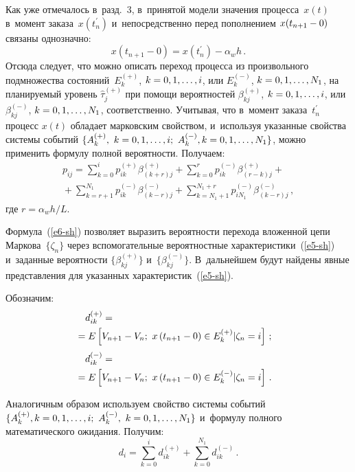 \begin{multicols}{2}
  Как уже отмечалось в~разд.~3, в~принятой модели значения процесса~$x(t)$ 
в~момент заказа~$x(t_n^\prime)$ и~непосредственно перед пополнением 
$x(t_{n+1}\hm-0)$ связаны однозначно: 
  $$
  x\left(t_{n+1}-0\right)= x\left(t_n^\prime\right)- \alpha_w h\,.
  $$
     Отсюда следует, что 
можно описать переход процесса из произвольного подмножества 
состояний~$E_k^{(+)}$, $k\hm=0,1,\ldots ,i$,  или $E_k^{(-)}$, $k\hm=0,1,\ldots , 
N_1$, на планируемый уровень $\hat{\tau}_j^{(+)}$ при помощи вероятностей 
$\beta_{kj}^{(+)}$, $k\hm=0,1,\ldots ,i$,  или~$\beta_{kj}^{(-)}$, $k\hm=0,1,\ldots 
, N_1$, соответственно. Учитывая, что в~момент заказа~$t_n^\prime$ процесс 
$x(t)$ обладает марковским свойством, и~используя указанные свойства 
системы событий $\{A_k^{(+)},\ k\hm= 0,1,\ldots, i;\ A_k^{(-)}, k\hm= 0,1,\ldots , 
N_1\}$, можно применить формулу полной вероятности. По\-лу\-чаем:
  \begin{multline}
  p_{ij}=\sum\limits^i_{k=0} p_{ik}^{(+)} \beta^{(+)}_{(k+r)j} 
+\sum\limits^r_{k=0} p_{ik}^{(-)} \beta^{(+)}_{(r-k)j} 
+{}\\[3pt]
{}+\sum\limits^{N_1}_{k=r+1} p_{ik}^{(-)} \beta^{(-)}_{(k-r)j}
+ \sum\limits_{k=N_1+1}^{N_1+r} p_{iN_1}^{(-)} \beta_{(k-r)j}^{(-)}\,,
  \label{e6-sh}
  \end{multline}
где $r=\alpha_w h/L$.

  Формула~(\ref{e6-sh}) позволяет выразить вероятности перехода вложенной 
цепи Маркова~$\{\zeta_n\}$ через вспомогательные вероятностные 
характеристики~(\ref{e5-sh}) и~заданные вероятности  
$\{ \beta_{kj}^{(+)}\}$ и~$\{\beta_{kj}^{(-)}\}$. В~дальнейшем будут найдены 
явные представления для указанных характеристик~(\ref{e5-sh}). 
{ %

}
  
  Обозначим:
  \begin{align}
  d_{ik}^{(+)} &={}\notag\\
&\hspace*{-10mm} {}= E\left[ V_{n+1} -V_n;\ x\left( t_{n+1}-0\right)\in E_k^{(+)}\vert 
\zeta_n=i\right]\,;\label{e7-sh}\\[3pt]
  d_{ik}^{(-)} &={}\notag\\
  &\hspace*{-10mm}{}= E\left[ V_{n+1} -V_n;\ x\left( t_{n+1}-0\right)\in E_k^{(-)}\vert 
\zeta_n=i\right]\,.\label{e8-sh}
  \end{align}
  
  Аналогичным образом используем свойство сис\-те\-мы событий  
$\{ A_k^{(+)}, k\hm= 0,1,\ldots , i;\ A_k^{(-)},\ k\hm=0,1,\ldots , N_1\}$ 
и~формулу полного математического ожидания. Получим:
  \begin{equation}
  d_i=\sum\limits^i_{k=0} d_{ik}^{(+)} +\sum\limits_{k=0}^{N_1} 
  d_{ik}^{(-)}\,.
  \label{e9-sh}
  \end{equation}
  

\end{multicols}
